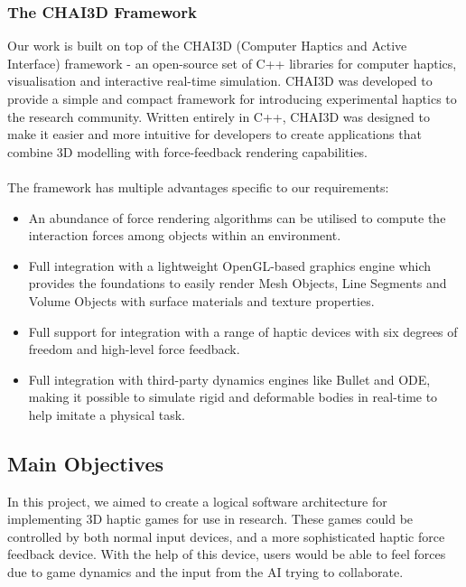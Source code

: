 \documentclass[a4paper]{article}
\begin{document}
\subsubsection{The CHAI3D Framework}
Our work is built on top of the CHAI3D\cite{ref4} (Computer Haptics and Active Interface) framework - an open-source set of C++ libraries for computer haptics, visualisation and interactive real-time simulation. CHAI3D was developed to provide a simple and compact framework for introducing experimental haptics to the research community. Written entirely in C++, CHAI3D was designed to make it easier and more intuitive for developers to create applications that combine 3D modelling with force-feedback rendering capabilities.
\\ \\ 
The framework has multiple advantages specific to our requirements: 
\begin{itemize}
    \item An abundance of force rendering algorithms can be utilised to compute the interaction forces among objects within an environment.
    \item Full integration with a lightweight OpenGL-based graphics engine which provides the foundations to easily render Mesh Objects, Line Segments and Volume Objects with surface materials and texture properties.
    \item Full support for integration with a range of haptic devices with six degrees of freedom and high-level force feedback. 
    \item Full integration with third-party dynamics engines like Bullet and ODE, making it possible to simulate rigid and deformable bodies in real-time to help imitate a physical task.
\end{itemize}

\subsection{Main Objectives}
In this project, we aimed to create a logical software architecture for implementing 3D haptic games for use in research. These games could be controlled by both normal input devices, and a more sophisticated haptic force feedback device. With the help of this device, users would be able to feel forces due to game dynamics and the input from the AI trying to collaborate. \\
\end{document}
